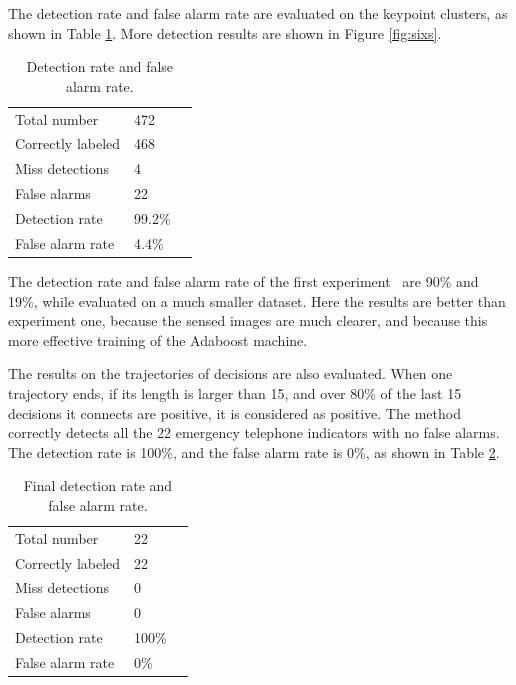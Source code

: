 The detection rate and false alarm rate are evaluated on the keypoint clusters, as shown in Table \ref{tb:tb2}.
More detection results are shown in Figure \ref{fig:sixs}.
\begin{table}[h]
\centering
\begin{tabular}{lll}
     \hline
     \hline
    Total number &	472  \\
    Correctly labeled &	468   \\
    Miss detections &	4 &	  \\
    False alarms &	22    \\
    Detection rate &	99.2\% &	  \\
    False alarm rate &	4.4\% &	   \\
   \hline
\end{tabular}
\caption[Detection rate and false alarm rate]{Detection rate and false alarm rate.}\label{tb:tb2}
\end{table}





The detection rate and false alarm rate of the first experiment~\citep{wang1} are 90\% and 19\%, while evaluated on a much smaller dataset. Here the results are better than   experiment one, because the sensed images are much clearer, and because this more effective training of the Adaboost machine.

The results on the trajectories of decisions are also evaluated. When one trajectory ends, if its length is larger than 15, and over 80\% of the last 15 decisions it connects are positive, it is considered as positive. The method correctly detects all the 22 emergency telephone indicators with no false alarms. The detection rate is 100\%, and the false alarm rate is 0\%, as shown in Table \ref{tb:tb3}.

\begin{table}[h]
\centering
\begin{tabular}{lll}
     \hline
     \hline
   Total number & 22  \\
    Correctly labeled &	22   \\
    Miss detections &	0 &	  \\
    False alarms &	0    \\
    Detection rate &	100\% &	  \\
    False alarm rate &	0\% &	   \\
   \hline
\end{tabular}
\caption[Final detection rate and false alarm rate]{Final detection rate and false alarm rate.}\label{tb:tb3}
\end{table}

